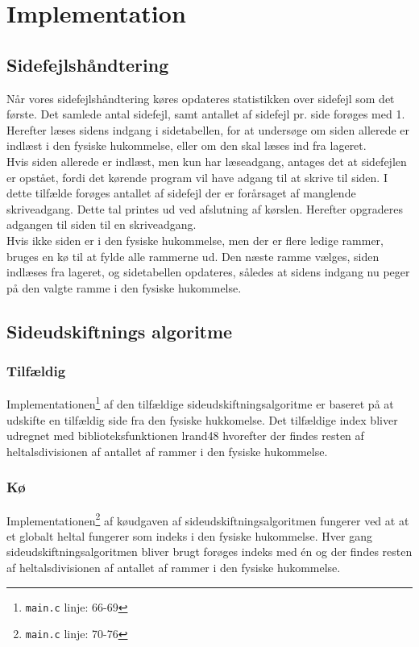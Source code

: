 \section{Implementation}
\subsection{Sidefejlshåndtering}
Når vores sidefejlshåndtering køres opdateres statistikken over sidefejl som det første. Det samlede antal sidefejl, samt antallet af sidefejl pr. side forøges med 1. Herefter læses sidens indgang i sidetabellen, for at undersøge om siden allerede er indlæst i den fysiske hukommelse, eller om den skal læses ind fra lageret.\\

Hvis siden allerede er indlæst, men kun har læseadgang, antages det at sidefejlen er opstået, fordi det kørende program vil have adgang til at skrive til siden. I dette tilfælde forøges antallet af sidefejl der er forårsaget af manglende skriveadgang. Dette tal printes ud ved afslutning af kørslen. Herefter opgraderes adgangen til siden til en skriveadgang.\\

Hvis ikke siden er i den fysiske hukommelse, men der er flere ledige rammer, bruges en kø til at fylde alle rammerne ud. Den næste ramme vælges, siden indlæses fra lageret, og sidetabellen opdateres, således at sidens indgang nu peger på den valgte ramme i den fysiske hukommelse.

\subsection{Sideudskiftnings algoritme}
\subsubsection{Tilfældig}
Implementationen\footnote{\texttt{main.c} linje: 66-69} af den tilfældige sideudskiftningsalgoritme er baseret på at udskifte en tilfældig side fra den fysiske hukkomelse. Det tilfældige index bliver udregnet med biblioteksfunktionen lrand48 hvorefter der findes resten af heltalsdivisionen af antallet af rammer i den fysiske hukommelse.

\subsubsection{Kø}
Implementationen\footnote{\texttt{main.c} linje: 70-76} af køudgaven af sideudskiftningsalgoritmen fungerer ved at at et globalt heltal fungerer som indeks i den fysiske hukommelse. Hver gang sideudskiftningsalgoritmen bliver brugt forøges indeks med én og der findes resten af heltalsdivisionen af antallet af rammer i den fysiske hukommelse.


